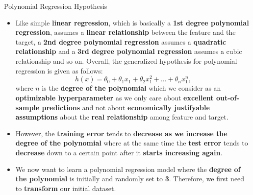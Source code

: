 \documentclass[main.tex]{subfiles}
\begin{document}
    \begin{frame}{Polynomial Regression Hypothesis}
        \begin{itemize}
            \item Like simple \textbf{linear regression}, which is basically a \textbf{1st degree polynomial regression}, assumes a \textbf{linear relationship} between the feature and the target, a \textbf{2nd degree polynomial regression} assumes a \textbf{quadratic relationship} and a \textbf{3rd degree polynomial regression} assumes a cubic relationship and so on. Overall, the generalized hypothesis for polynomial regression is given as follows:
            $$h(x) = \theta_0 + \theta_1x_1 + \theta_2x_1^2 + \dots + \theta_nx_1^n,$$
            where $n$ is the \textbf{degree of the polynomial} which we consider as an \textbf{optimizable hyperparameter} as we only care about \textbf{excellent out-of-sample predictions} and not about \textbf{economically justifyable assumptions} about the \textbf{real relationship} among feature and target.
            \item However, the \textbf{training error} tends to \textbf{decrease as we increase the degree of the polynomial} where at the same time the \textbf{test error} tends to \textbf{decrease} down to a certain point after it \textbf{starts increasing again}.
            \item We now want to learn a polynomial regression model where the \textbf{degree of the polynomial} is initially and randomly set to \textbf{3}. Therefore, we first need to \textbf{transform} our initial dataset.
        \end{itemize}
    \end{frame}
\end{document}
